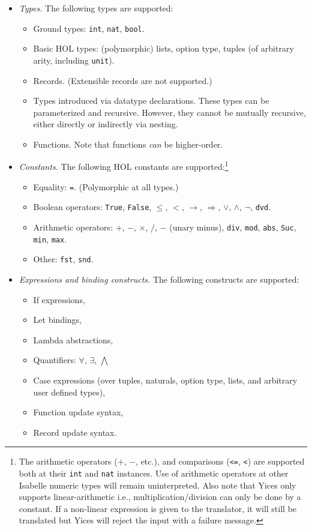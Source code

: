 \documentclass{article}
\begin{document}
\begin{itemize}
\item {\em Types.} The following types are supported:
\begin{itemize}
  \item Ground types: {\tt int}, {\tt nat}, {\tt bool}.
  \item Basic HOL types: (polymorphic) lists, option type, tuples (of arbitrary arity, including {\tt unit}).
  \item Records. (Extensible records are not supported.) 
  \item Types introduced via datatype declarations. These types can be parameterized
  and recursive. However, they cannot be mutually recursive, either directly or indirectly via nesting.
  \item Functions. Note that functions {\em can} be higher-order.
\end{itemize}
\item{\em Constants.}
The following HOL constants are supported:\footnote{The arithmetic operators ({\tt $+$}, {\tt $-$}, etc.), and
comparisons ({\tt <=}, {\tt <}) are supported
both at their {\tt int} and {\tt nat} instances. Use of arithmetic operators at
other Isabelle numeric types will remain uninterpreted. Also note that Yices only supports linear-arithmetic 
i.e., multiplication/division can only be done by a constant. If a non-linear expression is given to the
translator, it will still be translated but Yices will reject the input with a failure message.}
\begin{itemize}
  \item Equality: {\tt =}. (Polymorphic at all types.)
  \item Boolean operators: {\tt True}, {\tt False}, {\tt $\leq$}, {\tt $<$}, {\tt $\longrightarrow$}, {\tt $\Longrightarrow$}, 
  {\tt $\vee$}, {\tt $\wedge$}, {\tt $\neg$}, {\tt dvd}.
  \item Arithmetic operators:
       {\tt $+$}, {\tt $-$}, {\tt $\times$}, {\tt $/$}, 
       {\tt $-$} (unary minus), 
       {\tt div}, {\tt mod}, 
       {\tt abs}, {\tt Suc},
       {\tt min}, {\tt max}.
  \item Other: {\tt fst}, {\tt snd}.
\end{itemize} 
\item{\em Expressions and binding constructs.}
The following constructs are supported:
\begin{itemize}
  \item If expressions,
  \item Let bindings,
  \item Lambda abstractions,
  \item Quantifiers: $\forall$, $\exists$, $\bigwedge$ 
  \item Case expressions (over tuples, naturals, option type, lists, and arbitrary user defined types),
  \item Function update syntax,
  \item Record update syntax.
\end{itemize}
\end{itemize}
\newpage
\end{document}
